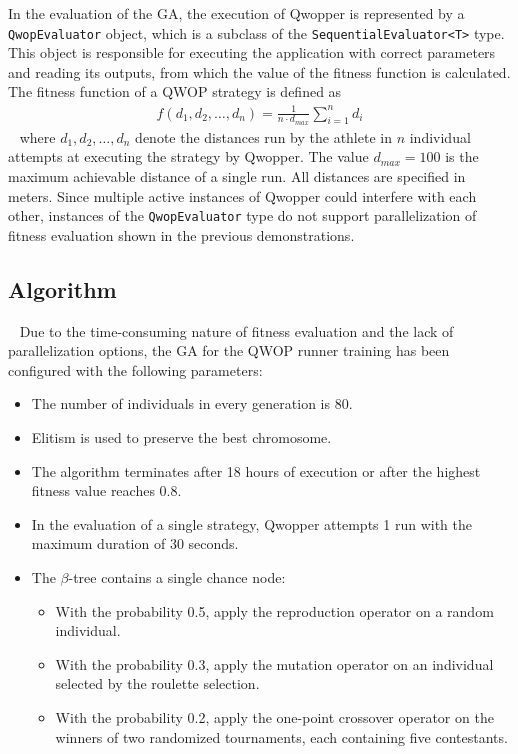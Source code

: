 In the evaluation of the GA, the execution of Qwopper is represented by a \texttt{QwopEvaluator} object, which is a subclass of the \texttt{SequentialEvaluator<T>} type. This object is responsible for executing the application with correct parameters and reading its outputs, from which the value of the fitness function is calculated. The fitness function of a QWOP strategy is defined as
~
\begin{align}
	f(d_1,d_2,\dots,d_n) = \frac{1}{n \cdot d_{max}} \sum_{i=1}^n d_i
\end{align}
~
where $d_1,d_2,\dots,d_n$ denote the distances run by the athlete in $n$ individual attempts at executing the strategy by Qwopper. The value $d_{max}=100$ is the maximum achievable distance of a single run. All distances are specified in meters. Since multiple active instances of Qwopper could interfere with each other, instances of the \texttt{QwopEvaluator} type do not support parallelization of fitness evaluation shown in the previous demonstrations.

\subsection{Algorithm}~\label{section:qwop-algorithm}
Due to the time-consuming nature of fitness evaluation and the lack of parallelization options, the GA for the QWOP runner training has been configured with the following parameters:
~
\begin{itemize}
	\item The number of individuals in every generation is 80.
	\item Elitism is used to preserve the best chromosome.
	\item The algorithm terminates after 18 hours of execution or after the highest fitness value reaches 0.8.
	\item In the evaluation of a single strategy, Qwopper attempts 1 run with the maximum duration of 30 seconds.
	\item The $\beta$-tree contains a single chance node:
	~
	\begin{itemize}
		\item With the probability 0.5, apply the reproduction operator on a random individual.
		\item With the probability 0.3, apply the mutation operator on an individual selected by the roulette selection.
		\item With the probability 0.2, apply the one-point crossover operator on the winners of two randomized tournaments, each containing five contestants.
	\end{itemize}
\end{itemize}

